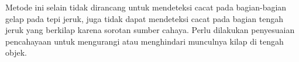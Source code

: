 \documentclass[laporan.tex]{subfiles}
\begin{document}
Metode ini selain tidak dirancang untuk mendeteksi cacat pada bagian-bagian gelap pada tepi jeruk, juga tidak dapat mendeteksi cacat pada bagian tengah jeruk yang berkilap karena sorotan sumber cahaya. Perlu dilakukan penyesuaian pencahayaan untuk mengurangi atau menghindari munculnya kilap di tengah objek.


\end{document}
